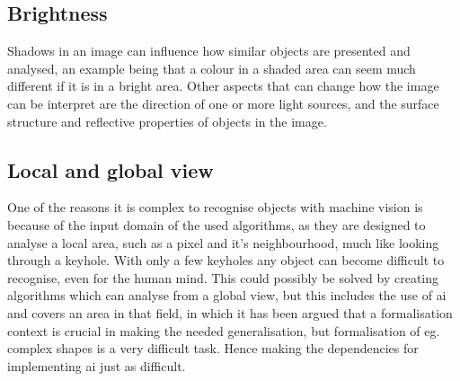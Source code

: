 \subsection{Brightness}
Shadows in an image can influence how similar objects are presented and analysed, an example being that a colour in a shaded area can seem much different if it is in a bright area. Other aspects that can change how the image can be interpret are the direction of one or more light sources, and the surface structure and reflective properties of objects in the image.

\subsection{Local and global view}\label{ssc:loc_glo_view}
One of the reasons it is complex to recognise objects with machine vision is because of the input domain of the used algorithms, as they are designed to analyse a local area, such as a pixel and it's neighbourhood, much like looking through a keyhole. With only a few keyholes any object can become difficult to recognise, even for the human mind. This could possibly be solved by creating algorithms which can analyse from a global view, but this includes the use of \gls{ai} and covers an area in that field, in which it has been argued that a formalisation context is crucial in making the needed generalisation, but formalisation of eg. complex shapes is a very difficult task. Hence making the dependencies for implementing \gls{ai} just as difficult. \citep[page 5]{obj_recogn_book}